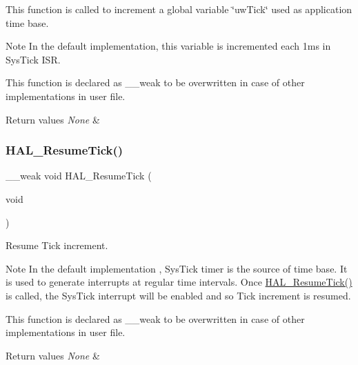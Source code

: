 This function is called to increment a global variable \char`\"{}uw\+Tick\char`\"{} used as application time base. 

\begin{DoxyNote}{Note}
In the default implementation, this variable is incremented each 1ms in Sys\+Tick I\+SR. 

This function is declared as \+\_\+\+\_\+weak to be overwritten in case of other implementations in user file. 
\end{DoxyNote}

\begin{DoxyRetVals}{Return values}
{\em None} & \\
\hline
\end{DoxyRetVals}
\mbox{\label{group___h_a_l___exported___functions___group2_gac3fa17aa85e357e3f1af56ad110d2e97}} 
\subsubsection{\texorpdfstring{H\+A\+L\+\_\+\+Resume\+Tick()}{HAL\_ResumeTick()}}
{\footnotesize\ttfamily \+\_\+\+\_\+weak void H\+A\+L\+\_\+\+Resume\+Tick (\begin{DoxyParamCaption}\item[{void}]{ }\end{DoxyParamCaption})}



Resume Tick increment. 

\begin{DoxyNote}{Note}
In the default implementation , Sys\+Tick timer is the source of time base. It is used to generate interrupts at regular time intervals. Once \hyperlink{group___h_a_l___exported___functions___group2_gac3fa17aa85e357e3f1af56ad110d2e97}{H\+A\+L\+\_\+\+Resume\+Tick()} is called, the Sys\+Tick interrupt will be enabled and so Tick increment is resumed. 

This function is declared as \+\_\+\+\_\+weak to be overwritten in case of other implementations in user file. 
\end{DoxyNote}

\begin{DoxyRetVals}{Return values}
{\em None} & \\
\hline
\end{DoxyRetVals}
\mbox{\label{group___h_a_l___exported___functions___group2_ga47f2dd240b2aed823a76b11496f37690}} 
